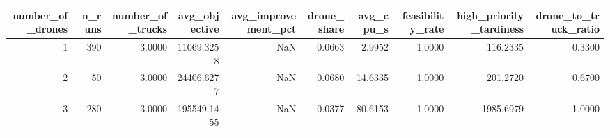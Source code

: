 \begin{tabular}{rrrrrrrrrr}
\toprule
number_of_drones & n_runs & number_of_trucks & avg_objective & avg_improvement_pct & drone_share & avg_cpu_s & feasibility_rate & high_priority_tardiness & drone_to_truck_ratio \\
\midrule
1 & 390 & 3.0000 & 11069.3258 & NaN & 0.0663 & 2.9952 & 1.0000 & 116.2335 & 0.3300 \\
2 & 50 & 3.0000 & 24406.6277 & NaN & 0.0680 & 14.6335 & 1.0000 & 201.2720 & 0.6700 \\
3 & 280 & 3.0000 & 195549.1455 & NaN & 0.0377 & 80.6153 & 1.0000 & 1985.6979 & 1.0000 \\
\bottomrule
\end{tabular}
